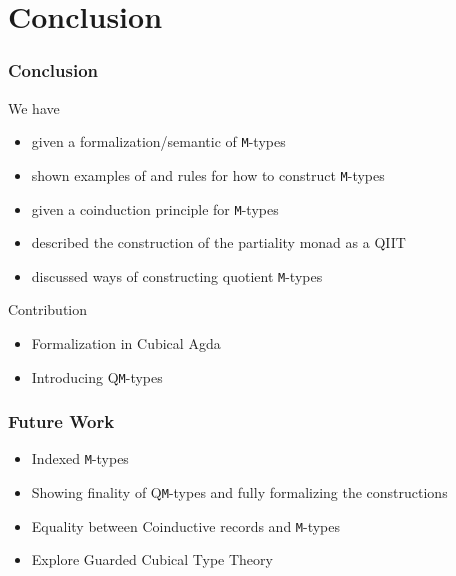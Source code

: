 \documentclass[xelatex,mathserif,serif,notheorems]{beamer} %
\theoremstyle{plain} %
\theoremstyle{definition}
\theoremstyle{remark}
\begin{document}
\section{Conclusion}
\begin{frame}
  \frametitle{Conclusion}
  We have
  \begin{itemize}
  \item given a formalization/semantic of \texttt{M}-types %
  \item shown examples of and rules for how to construct \texttt{M}-types
  \item given a coinduction principle for \texttt{M}-types
  \item described the construction of the partiality monad as a QIIT
  \item discussed ways of constructing quotient \texttt{M}-types
  \end{itemize}
  Contribution
  \begin{itemize}
  \item Formalization in Cubical Agda
  \item Introducing Q\texttt{M}-types
  \end{itemize}
\end{frame}

\begin{frame}
  \frametitle{Future Work}
  \begin{itemize}
  \item Indexed \texttt{M}-types
  \item Showing finality of Q\texttt{M}-types and fully formalizing the constructions %
  \item Equality between Coinductive records and \texttt{M}-types
  \item Explore Guarded Cubical Type Theory
  \end{itemize}
\end{frame}
\end{document}
